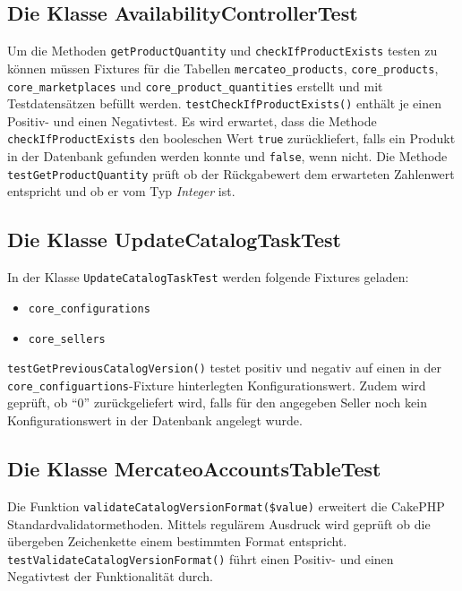	
	
	
	
	\subsection{Die Klasse AvailabilityControllerTest}
	
	Um die Methoden \texttt{getProductQuantity} und \texttt{checkIfProductExists} testen zu können müssen Fixtures für die Tabellen \texttt{mercateo\_products}, \texttt{core\_products}, \texttt{core\_marketplaces} und \texttt{core\_product\_quantities} erstellt und mit Testdatensätzen befüllt werden.
	\texttt{testCheckIfProductExists()} enthält je einen Positiv- und einen Negativtest. Es wird erwartet, dass die Methode \texttt{checkIfProductExists} den booleschen Wert \texttt{true} zurückliefert, falls ein Produkt in der Datenbank gefunden werden konnte und \texttt{false}, wenn nicht.
	Die Methode \texttt{testGetProductQuantity} prüft ob der Rückgabewert dem erwarteten Zahlenwert entspricht und ob er vom Typ \textit{Integer} ist.
	
	\subsection{Die Klasse UpdateCatalogTaskTest}
	
	In der Klasse \texttt{UpdateCatalogTaskTest} werden folgende Fixtures geladen:
	\begin{itemize}[nosep]
		\item \texttt{core\_configurations}
		\item \texttt{core\_sellers}

		
	\end{itemize}
	
	\texttt{testGetPreviousCatalogVersion()} testet positiv und negativ auf einen in der \texttt{core\_configuartions}-Fixture hinterlegten Konfigurationswert. Zudem wird geprüft, ob \enquote{0} zurückgeliefert wird, falls für den angegeben Seller noch kein Konfigurationswert in der Datenbank angelegt wurde.
	

	
	\subsection{Die Klasse MercateoAccountsTableTest}
	
	Die Funktion \texttt{validateCatalogVersionFormat(\$value)} erweitert die CakePHP Standardvalidatormethoden. Mittels regulärem Ausdruck wird geprüft ob die übergeben Zeichenkette einem bestimmten Format entspricht. \texttt{testValidateCatalogVersionFormat()} führt einen Positiv- und einen Negativtest der Funktionalität durch. 
	
